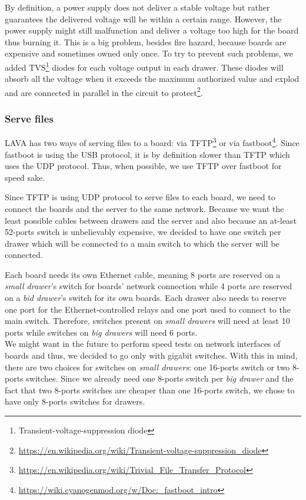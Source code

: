 By definition, a power supply does not deliver a stable voltage but rather guarantees the delivered voltage will be within a certain range. However, the power supply might still malfunction and deliver a voltage too high for the board thus burning it. This is a big problem, besides fire hazard, because boards are expensive and sometimes owned only once. To try to prevent such problems, we added TVS\footnote{Transient-voltage-suppression diode} diodes for each voltage output in each drawer. These diodes will absorb all the voltage when it exceeds the maximum authorized value and explod and are connected in parallel in the circuit to protect\footnote{\url{https://en.wikipedia.org/wiki/Transient-voltage-suppression\_diode}}.

\subsubsection{Serve files}

LAVA has two ways of serving files to a board: via TFTP\footnote{\url{https://en.wikipedia.org/wiki/Trivial\_File\_Transfer\_Protocol}} or via fastboot\footnote{\url{https://wiki.cyanogenmod.org/w/Doc:\_fastboot\_intro}}. Since fastboot is using the USB protocol, it is by definition slower than TFTP which uses the UDP protocol. Thus, when possible, we use TFTP over fastboot for speed sake.

Since TFTP is using UDP protocol to serve files to each board, we need to connect the boards and the server to the same network. Because we want the least possible cables between drawers and the server and also because an at-least 52-ports switch is unbelievably expensive, we decided to have one switch per drawer which will be connected to a main switch to which the server will be connected.

Each board needs its own Ethernet cable, meaning 8 ports are reserved on a \textit{small drawer}'s switch for boards' network connection while 4 ports are reserved on a \textit{bid drawer}'s switch for its own boards. Each drawer also needs to reserve one port for the Ethernet-controlled relays and one port used to connect to the main switch. Therefore, switches present on \textit{small drawers} will need at least 10 ports while switches on \textit{big drawers} will need 6 ports.\\
We might want in the future to perform speed tests on network interfaces of boards and thus, we decided to go only with gigabit switches. With this in mind, there are two choices for switches on \textit{small drawers}: one 16-ports switch or two 8-ports switches. Since we already need one 8-ports switch per \textit{big drawer} and the fact that two 8-ports switches are cheaper than one 16-ports switch, we chose to have only 8-ports switches for drawers.

